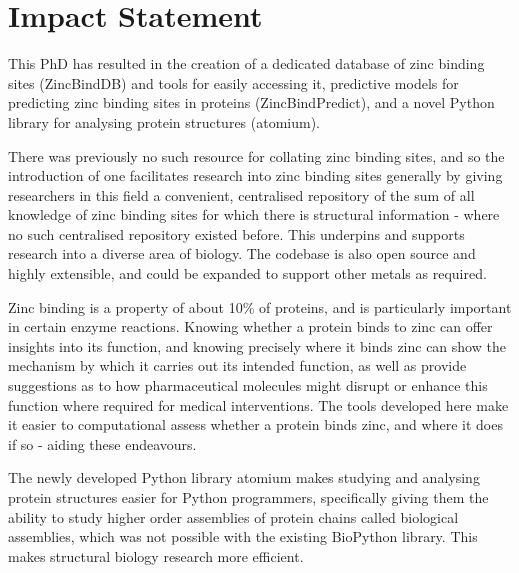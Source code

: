 \documentclass[a4paper, 12pt, oneside]{Style/UCLThesis}  %
\begin{document}
\chapter{Impact Statement}

\begin{small}
This PhD has resulted in the creation of a dedicated database of zinc binding sites (ZincBindDB) and tools for easily accessing it, predictive models for predicting zinc binding sites in proteins (ZincBindPredict), and a novel Python library for analysing protein structures (atomium).

There was previously no such resource for collating zinc binding sites, and so the introduction of one facilitates research into zinc binding sites generally by giving researchers in this field a convenient, centralised repository of the sum of all knowledge of zinc binding sites for which there is structural information - where no such centralised repository existed before. This underpins and supports research into a diverse area of biology. The codebase is also open source and highly extensible, and could be expanded to support other metals as required.

Zinc binding is a property of about 10\% of proteins, and is particularly important in certain enzyme reactions. Knowing whether a protein binds to zinc can offer insights into its function, and knowing precisely where it binds zinc can show the mechanism by which it carries out its intended function, as well as provide suggestions as to how pharmaceutical molecules might disrupt or enhance this function where required for medical interventions. The tools developed here make it easier to computational assess whether a protein binds zinc, and where it does if so - aiding these endeavours.

The newly developed Python library atomium makes studying and analysing protein structures easier for Python programmers, specifically giving them the ability to study higher order assemblies of protein chains called biological assemblies, which was not possible with the existing BioPython library. This makes structural biology research more efficient.
\end{small}


\clearpage  %
\end{document}
